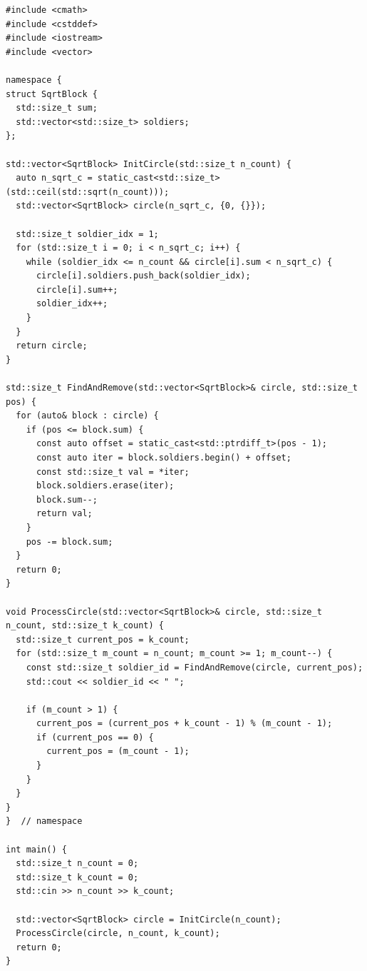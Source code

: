 \begin{lstlisting}
#include <cmath>
#include <cstddef>
#include <iostream>
#include <vector>

namespace {
struct SqrtBlock {
  std::size_t sum;
  std::vector<std::size_t> soldiers;
};

std::vector<SqrtBlock> InitCircle(std::size_t n_count) {
  auto n_sqrt_c = static_cast<std::size_t>(std::ceil(std::sqrt(n_count)));
  std::vector<SqrtBlock> circle(n_sqrt_c, {0, {}});

  std::size_t soldier_idx = 1;
  for (std::size_t i = 0; i < n_sqrt_c; i++) {
    while (soldier_idx <= n_count && circle[i].sum < n_sqrt_c) {
      circle[i].soldiers.push_back(soldier_idx);
      circle[i].sum++;
      soldier_idx++;
    }
  }
  return circle;
}

std::size_t FindAndRemove(std::vector<SqrtBlock>& circle, std::size_t pos) {
  for (auto& block : circle) {
    if (pos <= block.sum) {
      const auto offset = static_cast<std::ptrdiff_t>(pos - 1);
      const auto iter = block.soldiers.begin() + offset;
      const std::size_t val = *iter;
      block.soldiers.erase(iter);
      block.sum--;
      return val;
    }
    pos -= block.sum;
  }
  return 0;
}

void ProcessCircle(std::vector<SqrtBlock>& circle, std::size_t n_count, std::size_t k_count) {
  std::size_t current_pos = k_count;
  for (std::size_t m_count = n_count; m_count >= 1; m_count--) {
    const std::size_t soldier_id = FindAndRemove(circle, current_pos);
    std::cout << soldier_id << " ";

    if (m_count > 1) {
      current_pos = (current_pos + k_count - 1) % (m_count - 1);
      if (current_pos == 0) {
        current_pos = (m_count - 1);
      }
    }
  }
}
}  // namespace

int main() {
  std::size_t n_count = 0;
  std::size_t k_count = 0;
  std::cin >> n_count >> k_count;

  std::vector<SqrtBlock> circle = InitCircle(n_count);
  ProcessCircle(circle, n_count, k_count);
  return 0;
}
\end{lstlisting}